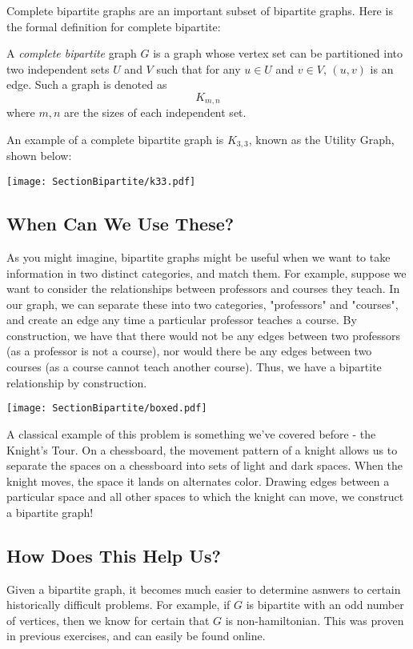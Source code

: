 Complete bipartite graphs are an important subset of bipartite graphs. Here is the formal definition for complete bipartite:

\begin{definition}
    A \textit{complete bipartite} graph $G$ is a graph whose vertex set can be partitioned into two independent sets $U$ and $V$ such that for any $u \in U$ and $v \in V$, $(u, v)$ is an edge. Such a graph is denoted as \[ K_{m,n} \] where $m, n$ are the sizes of each independent set.
\end{definition}

An example of a complete bipartite graph is $K_{3,3}$, known as the Utility Graph, shown below:

\begin{center}
    \texttt{[image: SectionBipartite/k33.pdf]}
\end{center}

\subsection{When Can We Use These?}
As you might imagine, bipartite graphs might be useful when we want to take information in two distinct categories, and match them. For example, suppose we want to consider the relationships between professors and courses they teach. In our graph, we can separate these into two categories, "professors" and "courses", and create an edge any time a particular professor teaches a course. By construction, we have that there would not be any edges between two professors (as a professor is not a course), nor would there be any edges between two courses (as a course cannot teach another course). Thus, we have a bipartite relationship by construction.

\begin{center}
    \texttt{[image: SectionBipartite/boxed.pdf]}
\end{center}

A classical example of this problem is something we've covered before - the Knight's Tour. On a chessboard, the movement pattern of a knight allows us to separate the spaces on a chessboard into sets of light and dark spaces. When the knight moves, the space it lands on alternates color. Drawing edges between a particular space and all other spaces to which the knight can move, we construct a bipartite graph!

\subsection{How Does This Help Us?}
Given a bipartite graph, it becomes much easier to determine asnwers to certain historically difficult problems. For example, if $G$ is bipartite with an odd number of vertices, then we know for certain that $G$ is non-hamiltonian. This was proven in previous exercises, and can easily be found online. 

